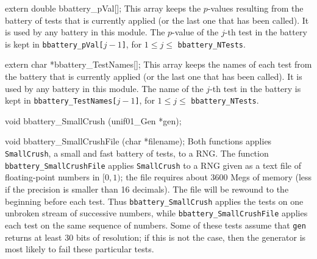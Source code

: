 extern double bbattery_pVal[];   
\endcode
  \tab This array keeps the $p$-values resulting from the  battery of tests
  that is currently applied (or the last one that has been called). It is
  used by any battery in this module. The $p$-value of the $j$-th test in 
  the battery is kept in {\tt bbattery\_pVal[$j-1$]}, for $1\le j\le $
  {\tt bbattery\_NTests}. 
 \endtab
\code


extern char *bbattery_TestNames[];   
\endcode
  \tab This array keeps the names of each test from  the 
  battery that is currently applied (or the last one that has
  been called). It is used by any battery in this module.
  The name of the $j$-th test in the battery is 
   kept in {\tt bbattery\_TestNames[$j-1$]}, 
  for $1\le j\le $ {\tt bbattery\_NTests}.
 \endtab



\code

void bbattery_SmallCrush (unif01_Gen *gen);

void bbattery_SmallCrushFile (char *filename);
\endcode
  \tab  Both functions applies {\tt SmallCrush}, a small and fast battery
   of tests, to a RNG. The function {\tt bbattery\_Small\-CrushFile} applies
  {\tt SmallCrush} to a RNG given as a text file of floating-point numbers in 
  $[0, 1)$; the file requires about 3600 Megs of memory 
  (less if the precision is smaller than 16 decimals). \label{bat:SmallCrush}
   The file will be rewound to the beginning before each test.
  Thus  {\tt bbattery\_SmallCrush} applies the tests on one unbroken
  stream of successive numbers, while {\tt bbattery\_Small\-CrushFile}
  applies each test on the same sequence of numbers.
  Some of these tests assume that {\tt gen} returns at least 30 bits of
  resolution; if this is not the case, then the generator is most likely to
  fail these particular tests.

